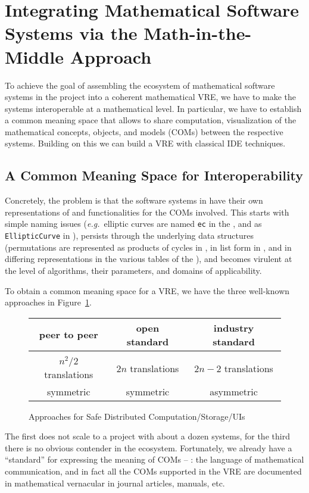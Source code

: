 \section{Integrating Mathematical Software Systems via the Math-in-the-Middle Approach}\label{sec:mitm}



To achieve the goal of assembling the ecosystem of mathematical software systems in the
\ODK project into a coherent mathematical VRE, we have to make the systems interoperable at
a mathematical level. In particular, we have to establish a common meaning space that
allows to share computation, visualization of the mathematical concepts, objects, and
models (COMs) between the respective systems. Building on this we can build a VRE with
classical IDE techniques. 

\subsection{A Common Meaning Space for Interoperability}
Concretely, the problem is that the software systems in \ODK have their own
representations of and functionalities for the COMs involved. This starts with simple
naming issues (\emph{e.g.}\ elliptic curves are named \lstinline|ec| in the \LMFDB, and as
\lstinline|EllipticCurve| in \Sage), persists through the underlying data structures
(permutations are represented as products of cycles in \GAP, in list form in \Sage, and in
differing representations in the various tables of the \LMFDB), and becomes virulent at
the level of algorithms, their parameters, and domains of applicability.

To obtain a common meaning space for a VRE, we have the three well-known approaches in
Figure~\ref{fig:interop}.
\begin{figure}[ht]\centering
  \begin{tabular}{|c|c|c|}\hline
    peer to peer & open standard & industry standard\\\hline
     &  & \\\hline
    $n^2/2$  translations & $2n$ translations & $2n-2$ translations \\
    symmetric & symmetric & asymmetric\\\hline
  \end{tabular}
  \caption{Approaches for Safe Distributed Computation/Storage/UIs}\label{fig:interop}
\end{figure}
The first does not scale to a project with about a dozen systems, for the third there is
no obvious contender in the \ODK ecosystem. Fortunately, we already have a ``standard'' for
expressing the meaning of COMs -- : the language of
mathematical communication, and in fact all the COMs supported in the \ODK VRE are documented
in mathematical vernacular in journal articles, manuals, etc.

